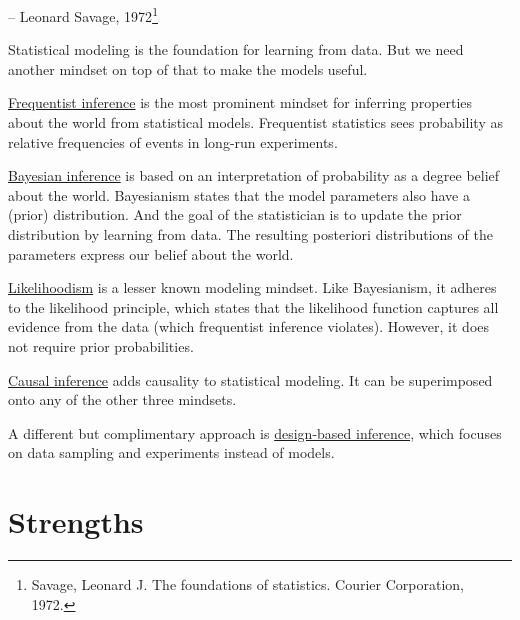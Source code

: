 \documentclass[
  10pt,
]{scrbook}
\begin{document}
-- Leonard Savage, 1972\footnote{Savage, Leonard J. The foundations of statistics. Courier Corporation, 1972.}

Statistical modeling is the foundation for learning from data.
But we need another mindset on top of that to make the models useful.

\protect\hyperlink{frequentism-frequentism}{Frequentist inference} is the most prominent mindset for inferring properties about the world from statistical models.
Frequentist statistics sees probability as relative frequencies of events in long-run experiments.

\protect\hyperlink{bayesian-inference}{Bayesian inference} is based on an interpretation of probability as a degree belief about the world.
Bayesianism states that the model parameters also have a (prior) distribution.
And the goal of the statistician is to update the prior distribution by learning from data.
The resulting posteriori distributions of the parameters express our belief about the world.

\protect\hyperlink{likelihoodism}{Likelihoodism} is a lesser known modeling mindset. Like Bayesianism, it adheres to the likelihood principle, which states that the likelihood function captures all evidence from the data (which frequentist inference violates).
However, it does not require prior probabilities.

\protect\hyperlink{causal-inference}{Causal inference} adds causality to statistical modeling. It can be superimposed onto any of the other three mindsets.

A different but complimentary approach is \protect\hyperlink{design-based-infernce}{design-based inference}, which focuses on data sampling and experiments instead of models.

\hypertarget{strengths}{%
\section{Strengths}\label{strengths}}
\end{document}
